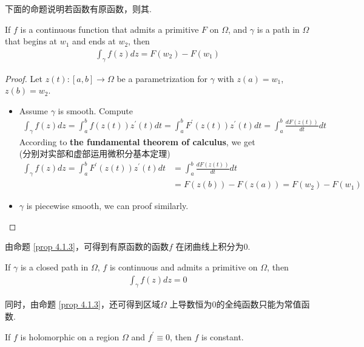 	\vspace{2em}
	下面的命题说明若函数有原函数，则其.
	\begin{proposition}\label{prop 4.1.3}
		If $f$ is a continuous function that admits a primitive $F$ on $\Omega$, and $\gamma$ is a path in $\Omega$ that begins at $w_1$ and ends at $w_2$, then
		\begin{align}
			\int_{\gamma}{f(z) dz}=  F(w_2) - F(w_1)
		\end{align}
	
		\vspace{2em}
		\begin{proof}
			Let $z(t) : [a , b] \longrightarrow \Omega$ be a parametrization for $\gamma$ with $z(a) = w_1$, $z(b) = w_2$.
			\begin{itemize}
				\item Assume $\gamma$ is smooth. Compute
				\begin{align}
					\int_{\gamma}{f(z) dz} = \int_{a}^{b}{f(z(t)) z^{'}(t) dt} = \int_{a}^{b}{F^{'}(z(t)) z^{'}(t) dt} = \int_{a}^{b}{\frac{dF(z(t))}{dt} dt}
				\end{align}
				According to \textbf{the fundamental theorem of calculus}, we get\\
				(分别对实部和虚部运用微积分基本定理)
				\begin{align}
					\int_{\gamma}{f(z) dz} 
					= \int_{a}^{b}{F^{'}(z(t)) z^{'}(t) dt} 
					&= \int_{a}^{b}{\frac{dF(z(t))}{dt} dt} \\
					&= F(z(b)) - F(z(a)) = F(w_2) - F(w_1)
				\end{align}
			
				\item $\gamma$ is piecewise smooth, we can proof similarly.
			\end{itemize}
		\end{proof}
	\end{proposition}

	\vspace{2em}
	由命题 \ref{prop 4.1.3}，可得到有原函数的函数$f$ 在闭曲线上积分为0.
	\begin{corollary}\label{cor 4.1.1}
		If $\gamma$ is a closed path in $\Omega$, $f$ is continuous and admits a primitive on $\Omega$, then
		\begin{align}
			\int_{\gamma}{f(z) dz} = 0
		\end{align}
	\end{corollary}

	\newpage
	同时，由命题 \ref{prop 4.1.3}，还可得到区域$\Omega$ 上导数恒为0的全纯函数只能为常值函数.
	\begin{corollary}\label{cor 4.1.2}
		If $f$ is holomorphic on a region $\Omega$ and $f^{'} \equiv 0$, then $f$ is constant.
	\end{corollary}

